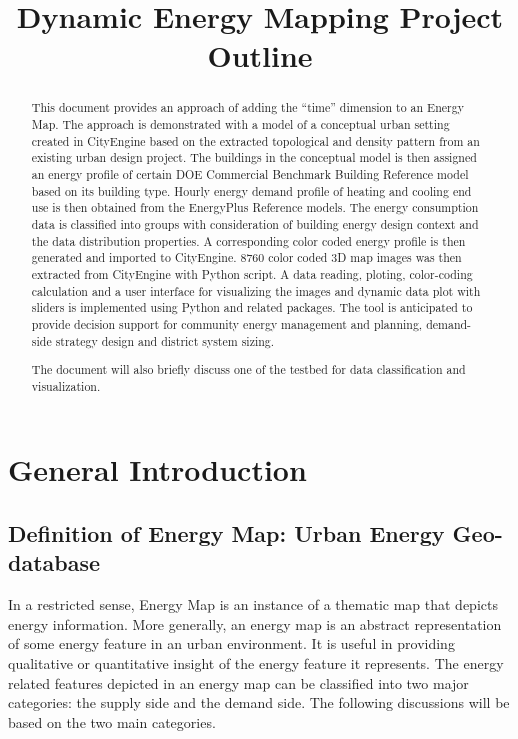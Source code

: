 \documentclass[12pt]{article}
\begin{document}
\title{Dynamic Energy Mapping Project Outline}
\maketitle
\tableofcontents
\newpage
\begin{abstract}
  This document provides an approach of adding the ``time'' dimension
  to an Energy Map. The approach is demonstrated with a model of a
  conceptual urban setting created in CityEngine based on the
  extracted topological and density pattern from an existing urban
  design project. The buildings in the conceptual model is then
  assigned an energy profile of certain DOE Commercial Benchmark
  Building Reference model based on its building type. Hourly energy
  demand profile of heating and cooling end use is then obtained from
  the EnergyPlus Reference models. The energy consumption data is
  classified into groups with consideration of building energy design
  context and the data distribution properties. A corresponding color
  coded energy profile is then generated and imported to
  CityEngine. 8760 color coded 3D map images was then extracted from
  CityEngine with Python script. A data reading, ploting,
  color-coding calculation and a user interface for visualizing the
  images and dynamic data plot with sliders is implemented using
  Python and related packages. The tool is anticipated to provide
  decision support for community energy management and
  planning, demand-side strategy design and district system sizing.
  
  The document will also briefly discuss one of the testbed for data
  classification and visualization.
\end{abstract}
\newpage
\section{General Introduction}
\subsection{Definition of Energy Map: Urban Energy Geo-database}
In a restricted sense, Energy Map is an instance of a thematic map
that depicts energy information. More generally, an energy map is an
abstract representation of some energy feature in an urban
environment. It is useful in providing qualitative or quantitative
insight of the energy feature it represents. The energy related
features depicted in an energy map can be classified into two major
categories: the supply side and the demand side. The following
discussions will be based on the two main categories.
\end{document}
